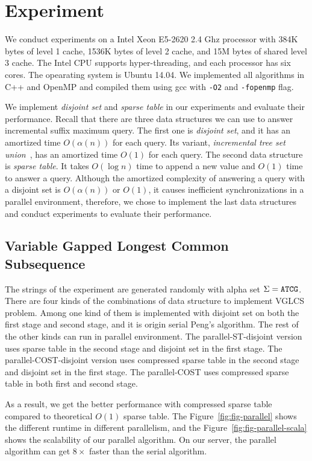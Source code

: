 \section{Experiment}
\label{sec:Experiment}

We conduct experiments on a Intel Xeon E5-2620 2.4 Ghz processor with
384K bytes of level 1 cache, 1536K bytes of level 2 cache, and 15M
bytes of shared level 3 cache.  The Intel CPU supports
hyper-threading, and each processor has six cores.  The opearating
system is Ubuntu 14.04.  We implemented all algorithms in C++ and
OpenMP and compiled them using gcc with {\tt -O2} and {\tt -fopenmp}
flag.

We implement {\em disjoint set} and {\em sparse table} in our
experiments and evaluate their performance.  Recall that there are three
data structures we can use to answer incremental suffix maximum query.
The first one is {\em disjoint set}, and it has an amortized time
$O(\alpha(n))$ for each query.  Its variant, {\em incremental   tree set
union}~\cite{Gabow1983ALA}, has an amortized time $O(1)$ for each query.
The second data structure is {\em sparse table}.  It takes $O(\log n)$
time to append a new value and $O(1)$ time to answer a query.  Although
the amortized complexity of answering a query with a disjoint set is
$O(\alpha(n))$ or $O(1)$, it causes inefficient synchronizations in a
parallel environment, therefore, we chose to implement the last data
structures and conduct experiments to evaluate their performance.

\subsection{Variable Gapped Longest Common Subsequence}

The strings of the experiment are generated randomly with alpha set
$\Sigma={\tt ATCG}$.   There are four kinds of the combinations of data
structure to implement VGLCS problem.  Among one kind of them is
implemented with disjoint set on both the first stage and second stage,
and it is origin serial Peng's algorithm.   The rest of the other kinds
can run in parallel environment.  The parallel-ST-disjoint version uses
sparse table in the second stage and disjoint set in the first stage.
The parallel-COST-disjoint version uses compressed sparse table in the
second stage and disjoint set in the first stage.  The parallel-COST
uses compressed sparse table in both first and second stage.

As a result, we get the better performance with compressed sparse table
compared to theoretical $O(1)$ sparse table.  The 
Figure~\ref{fig:fig-parallel} shows the different runtime in different 
parallelism, and the Figure~\ref{fig:fig-parallel-scala} shows the
scalability of our parallel algorithm.  On our server, the parallel
algorithm can get $8 \times$ faster than the serial algorithm.

